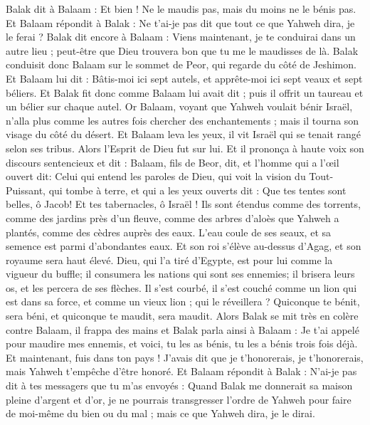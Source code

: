 \begin{multicols}{2}
Balak dit à Balaam : Et bien ! Ne le maudis pas, mais du moins ne le bénis pas.
Et Balaam répondit à Balak : Ne t'ai-je pas dit que tout ce que Yahweh dira, je le ferai ? 
Balak dit encore à Balaam : Viens maintenant, je te conduirai dans un autre lieu ; peut-être que Dieu trouvera bon que tu me le maudisses de là.
Balak conduisit donc Balaam sur le sommet de Peor, qui regarde du côté de Jeshimon.
Et Balaam lui dit : Bâtis-moi ici sept autels, et apprête-moi ici sept veaux et sept béliers.
Et Balak fit donc comme Balaam lui avait dit ; puis il offrit un taureau et un bélier sur chaque autel.
\VerseOne{}Or Balaam, voyant que Yahweh voulait bénir Israël, n'alla plus comme les autres fois chercher des enchantements ; mais il tourna son visage du côté du désert.
Et Balaam leva les yeux, il vit Israël qui se tenait rangé selon ses tribus. Alors l'Esprit de Dieu fut sur lui.
Et il prononça à haute voix son discours sentencieux et dit : Balaam, fils de Beor, dit, et l'homme qui a l'œil ouvert dit:
Celui qui entend les paroles de Dieu, qui voit la vision du Tout-Puissant, qui tombe à terre, et qui a les yeux ouverts dit :
Que tes tentes sont belles, ô Jacob! Et tes tabernacles, ô Israël !
Ils sont étendus comme des torrents, comme des jardins près d'un fleuve, comme des arbres d'aloès que Yahweh a plantés, comme des cèdres auprès des eaux.
L'eau coule de ses seaux, et sa semence est parmi d'abondantes eaux. Et son roi s'élève au-dessus d'Agag, et son royaume sera haut élevé.
Dieu, qui l'a tiré d'Egypte, est pour lui comme la vigueur du buffle; il consumera les nations qui sont ses ennemies; il brisera leurs os, et les percera de ses flèches.
Il s'est courbé, il s'est couché comme un lion qui est dans sa force, et comme un vieux lion ; qui le réveillera ? Quiconque te bénit, sera béni, et quiconque te maudit, sera maudit.
Alors Balak se mit très en colère contre Balaam, il frappa des mains et Balak parla ainsi à Balaam : Je t'ai appelé pour maudire mes ennemis, et voici, tu les as bénis, tu les a bénis trois fois déjà.
Et maintenant, fuis dans ton pays ! J'avais dit que je t'honorerais, je t'honorerais, mais Yahweh t'empêche d'être honoré.
Et Balaam répondit à Balak : N'ai-je pas dit à tes messagers que tu m'as envoyés :
Quand Balak me donnerait sa maison pleine d'argent et d'or, je ne pourrais transgresser l'ordre de Yahweh pour faire de moi-même du bien ou du mal ; mais ce que Yahweh dira, je le dirai.

\end{multicols}
